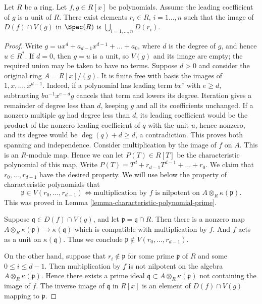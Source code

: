 \begin{lemma}
\label{lemma-affineline-special}
Let $R$ be a ring. Let $f, g \in R[x]$ be polynomials.
Assume the leading coefficient of $g$ is a unit of $R$.
There exist elements $r_i\in R$, $i = 1\ldots, n$ such that
the image of $D(f) \cap V(g)$ in $\Spec(R)$ is
$\bigcup_{i = 1, \ldots, n} D(r_i)$.
\end{lemma}

\begin{proof}
Write $g = ux^d + a_{d-1}x^{d-1} + \ldots + a_0$, where
$d$ is the degree of $g$, and hence $u \in R^*$.
If $d=0$, then $g=u$ is a unit, so $V(g)$ and its image are empty;
the required union may be taken to have no terms. Suppose $d>0$ and
consider the original ring $A=R[x]/(g)$. It is finite free with basis
the images of $1,x,\ldots,x^{d-1}$. Indeed, if a polynomial has leading
term $bx^e$ with $e\geq d$, subtracting
$bu^{-1}x^{e-d}g$ cancels that term and lowers its degree. Iteration
gives a remainder of degree less than $d$, keeping $g$ and all its
coefficients unchanged. If a nonzero multiple $qg$ had degree less
than $d$, its leading coefficient would be the product of the nonzero
leading coefficient of $q$ with the unit $u$, hence nonzero, and its
degree would be $\deg(q)+d\geq d$, a contradiction. This proves both
spanning and independence. Consider multiplication by the image of
$f$ on $A$. This is an $R$-module map.
Hence we can let $P(T) \in R[T]$ be the characteristic polynomial
of this map. Write $P(T) = T^d + r_{d-1} T^{d-1} + \ldots + r_0$.
We claim that $r_0, \ldots, r_{d-1}$ have the desired property.
We will use below the property of characteristic polynomials
that
$$
\mathfrak p \in V(r_0, \ldots, r_{d-1})
\Leftrightarrow
\text{multiplication by }f\text{ is nilpotent on }
A \otimes_R \kappa(\mathfrak p).
$$
This was proved in Lemma \ref{lemma-characteristic-polynomial-prime}.

\medskip\noindent
Suppose $\mathfrak q\in D(f) \cap V(g)$, and let
$\mathfrak p = \mathfrak q \cap R$. Then there is a nonzero map
$A \otimes_R \kappa(\mathfrak p) \to \kappa(\mathfrak q)$ which
is compatible with multiplication by $f$.
And $f$ acts as a unit on $\kappa(\mathfrak q)$.
Thus we conclude $\mathfrak p \not \in  V(r_0, \ldots, r_{d-1})$.

\medskip\noindent
On the other hand, suppose that $r_i \not\in \mathfrak p$ for some
prime $\mathfrak p$ of $R$ and some $0 \leq i \leq d - 1$.
Then multiplication by $f$ is not nilpotent on the algebra
$A \otimes_R \kappa(\mathfrak p)$.
Hence there exists a prime ideal $\overline{\mathfrak q} \subset
A \otimes_R \kappa(\mathfrak p)$ not containing the image of $f$.
The inverse image of $\overline{\mathfrak q}$ in $R[x]$
is an element of $D(f) \cap V(g)$ mapping to $\mathfrak p$.
\end{proof}